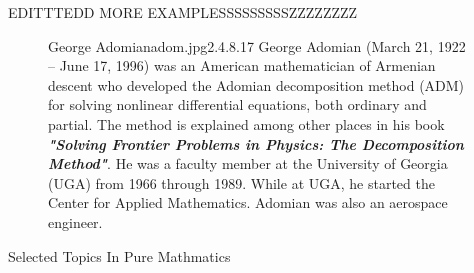 \documentclass[]{article}
\begin{document}
EDITTTEDD
MORE EXAMPLESSSSSSSSSZZZZZZZZ

\begin{figure}[b]
    \begin{enrichment}{George Adomian}{adom.jpg}{2.4}{.8}{.17}
        George Adomian (March 21, 1922 – June 17, 1996) 
        was an American mathematician of Armenian descent 
        who developed the Adomian decomposition method (ADM) 
        for solving nonlinear differential equations, 
        both ordinary and partial. 
        The method is explained among other places
        in his book \textit{\textbf{"Solving Frontier Problems in Physics: 
        The Decomposition Method"}}.
        He was a faculty member at the University of Georgia 
        (UGA) from 1966 through 1989. While at UGA, 
        he started the Center for Applied Mathematics. 
        Adomian was also an aerospace engineer.
    \end{enrichment}    
\end{figure}

\begingroup
\newpage
{}
\thispagestyle{empty}
\color{cover}
\begin{center}
    {
    \fontsize{20pt}{0}\handfont \color{white}
    Selected Topics In Pure Mathmatics
    }
\end{center}
\end{document}
